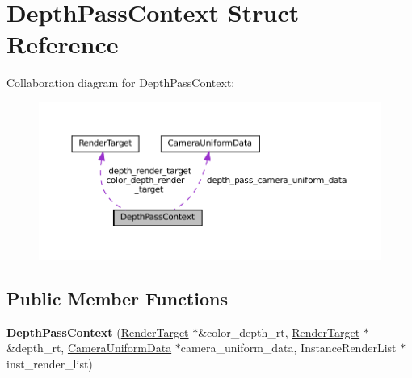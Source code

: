 \hypertarget{structDepthPassContext}{}\section{Depth\+Pass\+Context Struct Reference}
\label{structDepthPassContext}


Collaboration diagram for Depth\+Pass\+Context\+:\nopagebreak
\begin{figure}[H]
\begin{center}
\leavevmode
\includegraphics[width=350pt]{structDepthPassContext__coll__graph}
\end{center}
\end{figure}
\subsection*{Public Member Functions}
\begin{DoxyCompactItemize}
\item 
\mbox{\label{structDepthPassContext_acaebe13a776f081e1416ec25e33c3908}} 
{\bfseries Depth\+Pass\+Context} (\hyperlink{classRenderTarget}{Render\+Target} $\ast$\&color\+\_\+depth\+\_\+rt, \hyperlink{classRenderTarget}{Render\+Target} $\ast$\&depth\+\_\+rt, \hyperlink{structCameraUniformData}{Camera\+Uniform\+Data} $\ast$camera\+\_\+uniform\+\_\+data, Instance\+Render\+List $\ast$inst\+\_\+render\+\_\+list)
\end{DoxyCompactItemize}

